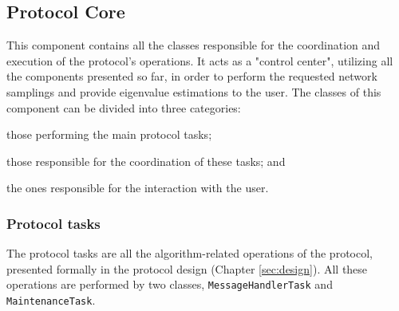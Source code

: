 \documentclass[a4paper,11pt,twoside]{report}
\newcommand{\classname}[1]{\texttt{#1}}
\begin{document}
\subsection{Protocol Core}
\label{sec:protocol_core}

This component contains all the classes responsible for the coordination and execution of the protocol's operations. It acts as a "control center", utilizing all the components presented so far, in order to perform the requested network samplings and provide eigenvalue estimations to the user. The classes of this component can be divided into three categories: \begin{inparaenum}
\item those performing the main protocol tasks;
\item those responsible for the coordination of these tasks; and
\item the ones responsible for the interaction with the user.
\end{inparaenum}


\subsubsection*{Protocol tasks}

The protocol tasks are all the algorithm-related operations of the protocol, presented formally in the protocol design (Chapter \ref{sec:design}). All these operations are performed by two classes, \classname{MessageHandlerTask} and \classname{MaintenanceTask}.
\end{document}
